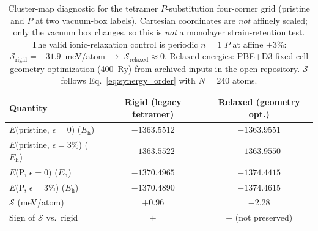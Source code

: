\begin{table}[!ht]
\caption{\label{tab:relaxext}Cluster-map diagnostic for the tetramer $P$-substitution four-corner grid (pristine and $P$ at two vacuum-box labels). Cartesian coordinates are \emph{not} affinely scaled; only the vacuum box changes, so this is \emph{not} a monolayer strain-retention test. The valid ionic-relaxation control is periodic $n{=}1$ $P$ at affine $+3$\%: $\mathcal{S}_{\mathrm{rigid}}=-31.9$~meV/atom $\to$ $\mathcal{S}_{\mathrm{relaxed}}\approx 0$. Relaxed energies: PBE+D3 fixed-cell geometry optimization (400~Ry) from archived inputs in the open repository. $\mathcal{S}$ follows Eq.~\eqref{eq:synergy_order} with $N{=}240$ atoms.}
\begin{ruledtabular}
\begin{tabular}{lcc}
Quantity & Rigid (legacy tetramer) & Relaxed (geometry opt.) \\
\hline
$E$(pristine, $\epsilon{=}0$) ($E_{\mathrm{h}}$) & $-1363.5512$ & $-1363.9551$ \\
$E$(pristine, $\epsilon{=}3$\%) ($E_{\mathrm{h}}$) & $-1363.5522$ & $-1363.9550$ \\
$E$(P, $\epsilon{=}0$) ($E_{\mathrm{h}}$) & $-1370.4965$ & $-1374.4415$ \\
$E$(P, $\epsilon{=}3$\%) ($E_{\mathrm{h}}$) & $-1370.4890$ & $-1374.4615$ \\
$\mathcal{S}$ (meV/atom) & $+0.96$ & $-2.28$ \\
Sign of $\mathcal{S}$ vs.\ rigid & $+$ & $-$ (not preserved) \\
\end{tabular}
\end{ruledtabular}
\end{table}

